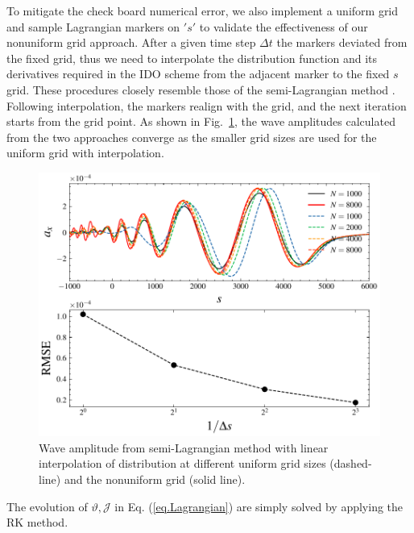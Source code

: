 To mitigate the check board numerical error, we also implement a uniform grid and sample Lagrangian markers on $'s'$ to validate the effectiveness of our nonuniform grid approach.
After a given time step $\Delta t$ the markers deviated from the fixed grid, thus  we need to interpolate the distribution function and its derivatives required in the IDO scheme from the adjacent marker to the fixed $s$ grid.
These procedures closely resemble those of the semi-Lagrangian method \cite{sonnendrucker1999,cottet2018}. Following interpolation, the markers realign with the grid, and the next iteration starts from the grid point.
As shown in Fig.~\ref{fig.cmp1}, the wave amplitudes calculated from  the two approaches converge  as the smaller grid sizes are used for the uniform grid with interpolation.  
\begin{figure}[htbp]
    \centering
    \includegraphics[scale=0.5]{cpc_img/fig_semiL.pdf}
    \caption{Wave amplitude from semi-Lagrangian method with linear interpolation of distribution at different uniform grid sizes (dashed-line) and the nonuniform grid (solid line).
    }
    \label{fig.cmp1}
\end{figure}
The evolution of $\vartheta,\mathcal{J}$ in Eq. (\ref{eq.Lagrangian}) are simply solved by applying the RK method.


